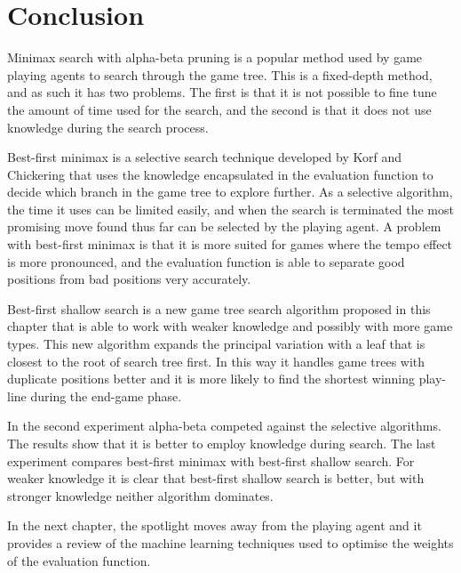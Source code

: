 \section{Conclusion}
\label{sec:tree-conclusion}
Minimax search with alpha-beta pruning is a popular method used by game playing agents to search through the game tree.  This is a fixed-depth method, and as such it has two problems.  The first is that it is not possible to fine tune the amount of time used for the search, and the second is that it does not use knowledge during the search process.

Best-first minimax is a selective search technique developed by Korf and Chickering that uses the knowledge encapsulated in the evaluation function to decide which branch in the game tree to explore further.  As a selective algorithm, the time it uses can be limited easily, and when the search is terminated the most promising move found thus far can be selected by the playing agent. A problem with best-first minimax is that it is more suited for games where the tempo effect is more pronounced, and the evaluation function is able to separate good positions from bad positions very accurately.    

Best-first shallow search is a new game tree search algorithm proposed in this chapter that is able to work with weaker knowledge and possibly with more game types.  This new algorithm expands the principal variation with a leaf that is closest to the root of search tree first.  In this way it handles game trees with duplicate positions better and it is more likely to find the shortest winning play-line during the end-game phase.

In the second experiment alpha-beta competed against the selective algorithms.  The results show that it is better to employ knowledge during search.  The last experiment compares best-first minimax with best-first shallow search.  For weaker knowledge it is clear that best-first shallow search is better, but with stronger knowledge neither algorithm dominates.  

In the next chapter, the spotlight moves away from the playing agent and it provides a review of the machine learning techniques used  to optimise the weights of the evaluation function. 